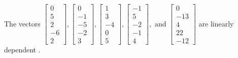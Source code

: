 \begin{exercise}
\begin{exerciseStatement}
  \end{exerciseStatement}
  \begin{exerciseAnswer}
   The vectors \(\left[\begin{array}{r}
0 \\
5 \\
2 \\
-6 \\
2
\end{array}\right] , \left[\begin{array}{r}
0 \\
-1 \\
-5 \\
-2 \\
3
\end{array}\right] , \left[\begin{array}{r}
1 \\
3 \\
-4 \\
0 \\
5
\end{array}\right] , \left[\begin{array}{r}
-1 \\
5 \\
-2 \\
-1 \\
4
\end{array}\right] , \text{ and } \left[\begin{array}{r}
0 \\
-13 \\
4 \\
22 \\
-12
\end{array}\right]\) are 
  	 linearly dependent  .
  


  \end{exerciseAnswer}
\end{exercise}